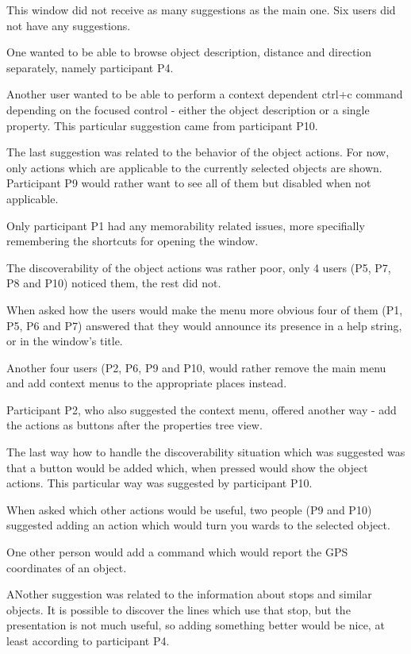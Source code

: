\documentclass[nolof,digital]{fithesis3}
\begin{document}
This window did not receive as many suggestions as the main one. Six users did not have any suggestions.

One wanted to be able to browse object description, distance and direction separately, namely participant P4.

Another user wanted to be able to perform a context dependent ctrl+c command depending on the focused control - either the object description or a single property. This particular suggestion came from participant P10.

The last suggestion was related to the behavior of the object actions. For now, only actions which are applicable to the currently selected objects are shown. Participant P9 would rather want to see all of them but disabled when not applicable.

Only participant P1 had any memorability related issues, more specifially remembering the shortcuts for opening the window.

The discoverability of the object actions was rather poor, only 4 users (P5, P7, P8 and P10) noticed them, the rest did not.

When asked how the users would make the menu more obvious four of them (P1, P5, P6 and P7) answered that they would announce its presence in a help string, or in the window's title.

Another four users (P2, P6, P9 and P10, would rather remove the main menu and add context menus to the appropriate places instead.

Participant P2, who also suggested the context menu, offered another way - add the actions as buttons after the properties tree view.

The last way how to handle the discoverability situation which was suggested was that a button would be added which, when pressed would show the object actions. This particular way was suggested by participant P10.

When asked which other actions would be useful, two people (P9 and P10) suggested adding an action which would turn you wards to the selected object.

One other person would add a command which would report the GPS coordinates of an object.

ANother suggestion was related to the information about stops and similar objects. It is possible to discover the lines which use that stop, but the presentation is not much useful, so adding something better would be nice, at least according to participant P4.
\end{document}
